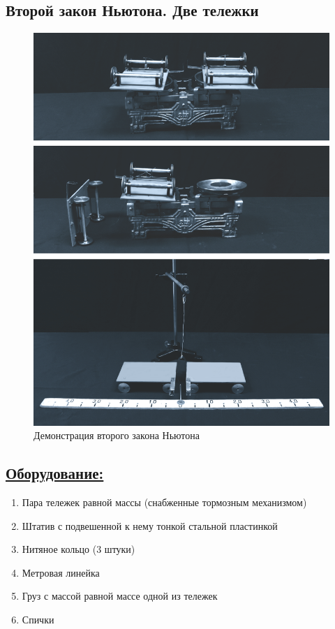 \documentclass[14pt,a4paper,oneside]{extarticle}	%
\begin{document}

\newpage
\begin{center}
	\subsection*{Второй закон Ньютона. Две тележки}
\end{center}

\begin{figure}[H]
	\centering 		
	\includegraphics[width=0.6\linewidth]{newton-1.png}
	\caption{Демонстрация второго закона Ньютона}
	\label{newton-1}
\end{figure}

\subsection*{\underline{Оборудование:}}

\begin{enumerate}
	\item Пара тележек равной массы (снабженные тормозным механизмом)
	\item Штатив с подвешенной к нему тонкой стальной пластинкой
	\item Нитяное кольцо (3 штуки)
	\item Метровая линейка
	\item Груз с массой равной массе одной из тележек
	\item Спички
\end{enumerate}
\end{document}
